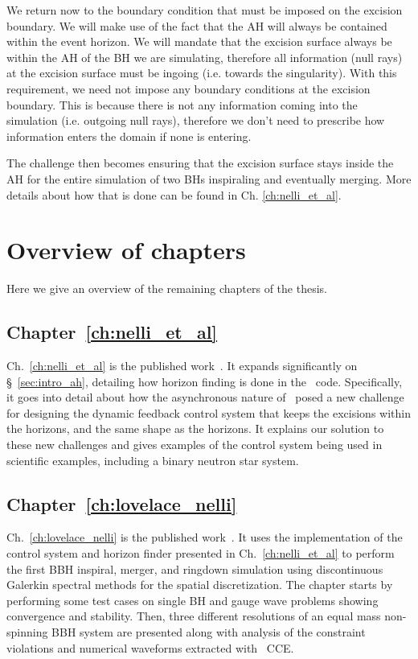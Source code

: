 \begin{bibunit}[unsrtnat]
We return now to the boundary condition that must be imposed on the excision
boundary. We will make use of the fact that the AH will always be contained
within the event horizon. We will mandate that the excision surface always be
within the AH of the BH we are simulating, therefore all information (null rays)
at the excision surface must be ingoing (i.e. towards the singularity). With
this requirement, we need not impose any boundary conditions at the excision
boundary. This is because there is not any information coming into the
simulation (i.e. outgoing null rays), therefore we don't need to prescribe how
information enters the domain if none is entering.

The challenge then becomes ensuring that the excision surface stays inside the
AH for the entire simulation of two BHs inspiraling and eventually
merging. More details about how that is done can be found in Ch.
\ref{ch:nelli_et_al}.

\section{Overview of chapters}

Here we give an overview of the remaining chapters of the thesis.

\subsection{Chapter~\ref{ch:nelli_et_al}}
Ch.~\ref{ch:nelli_et_al} is the published work~\cite{Nelli:2025vfc}. It
expands significantly on \S~\ref{sec:intro_ah}, detailing how horizon finding
is done in the \spectre~code. Specifically, it goes into detail about how the
asynchronous nature of \spectre~posed a new challenge for designing the dynamic
feedback control system that keeps the excisions within the horizons, and the
same shape as the horizons. It explains our solution to these new challenges and
gives examples of the control system being used in scientific examples,
including a binary neutron star system.

\subsection{Chapter~\ref{ch:lovelace_nelli}}
Ch.~\ref{ch:lovelace_nelli} is the published work~\cite{Lovelace:2024wra}.
It uses the implementation of the control system and horizon finder presented in
Ch.~\ref{ch:nelli_et_al} to perform the first BBH inspiral, merger, and ringdown
simulation using discontinuous Galerkin spectral methods for the spatial
discretization. The chapter starts by performing some test cases on single BH
and gauge wave problems showing convergence and stability. Then, three different
resolutions of an equal mass non-spinning BBH system are presented along with
analysis of the constraint violations and numerical waveforms extracted with
\spectre~CCE. 


\end{bibunit}
